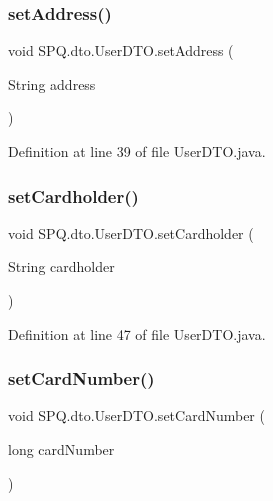 \subsubsection{\texorpdfstring{set\+Address()}{setAddress()}}
{\footnotesize\ttfamily void S\+P\+Q.\+dto.\+User\+D\+T\+O.\+set\+Address (\begin{DoxyParamCaption}\item[{String}]{address }\end{DoxyParamCaption})}



Definition at line 39 of file User\+D\+T\+O.\+java.

\mbox{\label{class_s_p_q_1_1dto_1_1_user_d_t_o_a3627efce4d0873f1e706e8ad65a28506}} 
\subsubsection{\texorpdfstring{set\+Cardholder()}{setCardholder()}}
{\footnotesize\ttfamily void S\+P\+Q.\+dto.\+User\+D\+T\+O.\+set\+Cardholder (\begin{DoxyParamCaption}\item[{String}]{cardholder }\end{DoxyParamCaption})}



Definition at line 47 of file User\+D\+T\+O.\+java.

\mbox{\label{class_s_p_q_1_1dto_1_1_user_d_t_o_a9f35044d63cd9769575a5ec019dc9cca}} 
\subsubsection{\texorpdfstring{set\+Card\+Number()}{setCardNumber()}}
{\footnotesize\ttfamily void S\+P\+Q.\+dto.\+User\+D\+T\+O.\+set\+Card\+Number (\begin{DoxyParamCaption}\item[{long}]{card\+Number }\end{DoxyParamCaption})}



